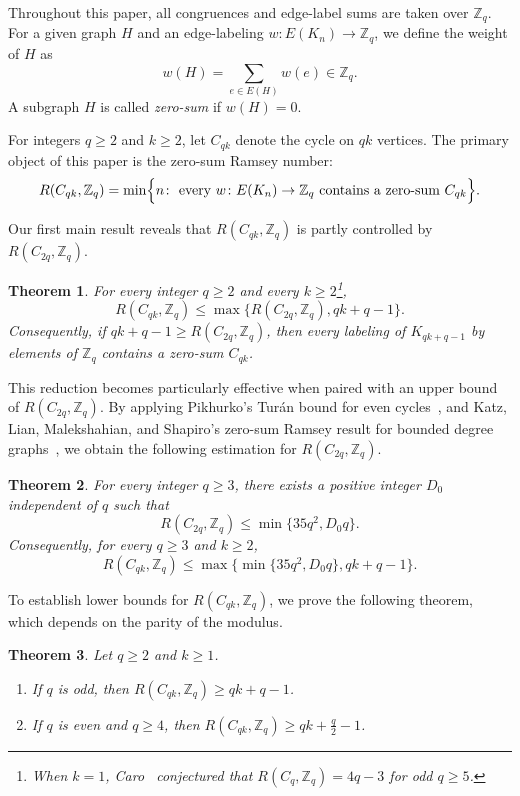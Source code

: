 \documentclass[11pt]{article}
\newtheorem{theorem}{Theorem}[section]
\theoremstyle{remark}
\newcommand{\Z}{\mathbb Z}
\begin{document}
Throughout this paper, all congruences and edge-label sums are taken over $\Z_q$.
For a given graph $H$ and an edge-labeling $w\colon E(K_n)\to \Z_q$, we define the weight of
$H$ as
\[
    w(H)=\sum_{e\in E(H)}w(e)\in \Z_q.
\]
A subgraph $H$ is called \emph{zero-sum} if $w(H)=0$.


For integers $q\ge 2$ and $k\ge 2$, let $C_{qk}$ denote the cycle on $qk$ vertices.
The primary object of this paper is the zero-sum Ramsey number:
\[
    R(C_{qk},\Z_q)=\min\Bigl\{n\colon \text{ every }w\colon E(K_n)\to \Z_q
    \text{ contains a zero-sum }C_{qk}\Bigr\}.
\]

Our first main result reveals that $R(C_{qk},\Z_q)$ is partly controlled by $R(C_{2q},\Z_q)$.

\begin{theorem}\label{thm:reduction}
    For every integer $q\ge 2$ and every $k\ge 2$\footnote{When $k=1$, Caro~\cite{Caro1996} conjectured that $R(C_q,\Z_q)=4q-3$ for odd $q\ge5$.},
    \[
        R(C_{qk},\Z_q)\le \max\{R(C_{2q},\Z_q),qk+q-1\}.
    \]
    Consequently, if $qk+q-1\ge R(C_{2q},\Z_q)$, then every labeling of $K_{qk+q-1}$ by elements of $\Z_q$ contains a zero-sum $C_{qk}$.
\end{theorem}

This reduction becomes particularly effective when paired with an upper bound of $R(C_{2q},\Z_q)$.
By applying Pikhurko's Tur\'an bound for even cycles~\cite{Pikhurko2012}, and Katz, Lian, Malekshahian, and Shapiro's zero-sum Ramsey result for bounded degree graphs~\cite{KLMS2025}, we obtain the following estimation for $R(C_{2q},\Z_q)$.

\begin{theorem}\label{thm:basecase}
    For every integer $q\ge 3$, there exists a positive integer $D_0$ independent of $q$ such that
    \[
        R(C_{2q},\Z_q)\le \min\{35q^2,D_0q\}.
    \]
    Consequently, for every $q\ge 3$ and $k\ge 2$,
    \[
        R(C_{qk},\Z_q)\le \max\{\min\{35q^2,D_0q\},qk+q-1\}.
    \]
\end{theorem}

To establish lower bounds for $R(C_{qk},\Z_q)$, we prove the following theorem, which depends on the parity of the modulus.

\begin{theorem}\label{thm:lower}
    Let $q\ge 2$ and $k\ge 1$.
    \begin{enumerate}[label=\textup{(\roman*)}]
        \item If $q$ is odd, then $R(C_{qk},\Z_q)\ge qk+q-1$.
        \item If $q$ is even and $q\ge 4$, then $R(C_{qk},\Z_q)\ge qk+\frac q2-1$.
    \end{enumerate}
\end{theorem}
\end{document}
